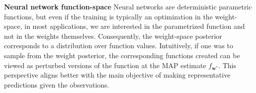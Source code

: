 \documentclass{article}
\newcommand{\mbf}[1]{\mathbf{#1}}
\newcommand{\vw}{\mbf{w}}
\begin{document}
\textbf{Neural network function-space} %
Neural networks are deterministic parametric functions, but even if the training is typically an optimization in the weight-space, in most applications, we are interested in the parametrized function and not in the weights themselves.
Consequently, the weight-space posterior corresponds to a distribution over function values.
Intuitively, if one was to sample from the weight posterior, the corresponding functions created can be viewed as perturbed versions of the function at the MAP estimate $f_{\vw^*}$. This perspective aligns better with the main objective of making representative predictions given the observations.
\end{document}
